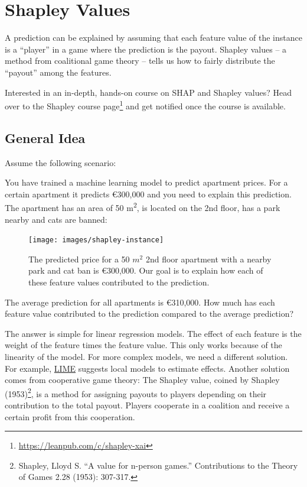 \documentclass[12pt,]{krantz}
\newcommand{\euro}{€}
\newenvironment{rmdnote}{}{}
\renewcommand{\href}[2]{#2\footnote{\url{#1}}}
\begin{document}
\newpage

\hypertarget{shapley}{\section{Shapley Values}\label{shapley}}

A prediction can be explained by assuming that each feature value of the
instance is a ``player'' in a game where the prediction is the payout.
Shapley values -- a method from coalitional game theory -- tells us how
to fairly distribute the ``payout'' among the features.

\begin{rmdnote} Interested in an in-depth, hands-on course on
SHAP and Shapley values? Head over to
\href{https://leanpub.com/c/shapley-xai}{the Shapley course page} and
get notified once the course is available. \end{rmdnote}

\subsection{General Idea}\label{general-idea}

Assume the following scenario:

You have trained a machine learning model to predict apartment prices.
For a certain apartment it predicts \euro{}300,000 and you need to
explain this prediction. The apartment has an area of 50
m\textsuperscript{2}, is located on the 2nd floor, has a park nearby and
cats are banned:

\begin{figure}

{\centering \texttt{[image: images/shapley-instance]} 

}

\caption{The predicted price for a 50 $m^2$ 2nd floor apartment with a nearby park and cat ban is €300,000. Our goal is to explain how each of these feature values contributed to the prediction.}\label{fig:shapley-instance}
\end{figure}

The average prediction for all apartments is \euro{}310,000. How much
has each feature value contributed to the prediction compared to the
average prediction?

The answer is simple for linear regression models. The effect of each
feature is the weight of the feature times the feature value. This only
works because of the linearity of the model. For more complex models, we
need a different solution. For example, \protect\hyperlink{lime}{LIME}
suggests local models to estimate effects. Another solution comes from
cooperative game theory: The Shapley value, coined by Shapley
(1953)\footnote{Shapley, Lloyd S. ``A value for n-person games.''
  Contributions to the Theory of Games 2.28 (1953): 307-317.}, is a
method for assigning payouts to players depending on their contribution
to the total payout. Players cooperate in a coalition and receive a
certain profit from this cooperation.
\end{document}
